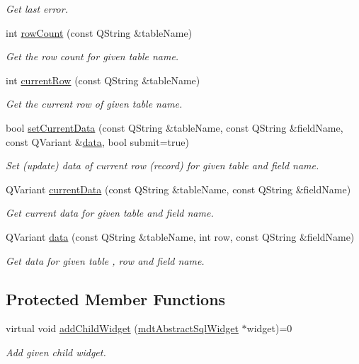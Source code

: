 \begin{DoxyCompactItemize}
\begin{DoxyCompactList}\small\item\em Get last error. \end{DoxyCompactList}\item 
int \hyperlink{classmdt_sql_form_old_a859f22cee8de55dbc7111c85ee18cf94}{row\-Count} (const Q\-String \&table\-Name)
\begin{DoxyCompactList}\small\item\em Get the row count for given table name. \end{DoxyCompactList}\item 
int \hyperlink{classmdt_sql_form_old_a02f127ffff2add79efbdbe53b4294fd9}{current\-Row} (const Q\-String \&table\-Name)
\begin{DoxyCompactList}\small\item\em Get the current row of given table name. \end{DoxyCompactList}\item 
bool \hyperlink{classmdt_sql_form_old_a53239c8640705c64ad0d64e1737a0e9b}{set\-Current\-Data} (const Q\-String \&table\-Name, const Q\-String \&field\-Name, const Q\-Variant \&\hyperlink{classmdt_sql_form_old_aa86bf23666adb34e71b4a69e60717528}{data}, bool submit=true)
\begin{DoxyCompactList}\small\item\em Set (update) data of current row (record) for given table and field name. \end{DoxyCompactList}\item 
Q\-Variant \hyperlink{classmdt_sql_form_old_a70bf128500ad9f8a977124ffea58ec80}{current\-Data} (const Q\-String \&table\-Name, const Q\-String \&field\-Name)
\begin{DoxyCompactList}\small\item\em Get current data for given table and field name. \end{DoxyCompactList}\item 
Q\-Variant \hyperlink{classmdt_sql_form_old_aa86bf23666adb34e71b4a69e60717528}{data} (const Q\-String \&table\-Name, int row, const Q\-String \&field\-Name)
\begin{DoxyCompactList}\small\item\em Get data for given table , row and field name. \end{DoxyCompactList}\end{DoxyCompactItemize}
\subsection*{Protected Member Functions}
\begin{DoxyCompactItemize}
\item 
virtual void \hyperlink{classmdt_sql_form_old_a9b34f9398ff12b51768f762f5cd93451}{add\-Child\-Widget} (\hyperlink{classmdt_abstract_sql_widget}{mdt\-Abstract\-Sql\-Widget} $\ast$widget)=0
\begin{DoxyCompactList}\small\item\em Add given child widget. \end{DoxyCompactList}\end{DoxyCompactItemize}


